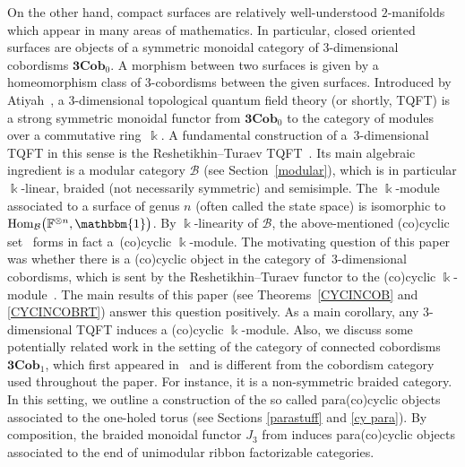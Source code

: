 \documentclass[pdftex]{sigma}
\numberwithin{equation}{section}
\newcommand{\tens}{\otimes}
\newcommand{\mc}{\mathcal}
\newcommand{\N}{\mathbb{N}}
\newcommand{\Hom}{\mathrm{Hom}}
\newcommand{\kk}{\Bbbk}
\newcommand{\uu}{\mathbbm{1}}
\newcommand{\coend}{\mathbb{F}}
\begin{document}
On the other hand, compact surfaces are relatively well-understood $2$-manifolds which appear in many areas of mathematics. In particular, closed oriented surfaces are objects of a symmetric monoidal category of $3$-dimensional cobordisms $\textbf{3Cob}_0$. A morphism between two surfaces is given by a homeomorphism class of $3$-cobordisms between the given surfaces. Introduced by Atiyah~\cite{At}, a $3$-dimensional topological quantum field theory (or shortly, TQFT) is a strong symmetric monoidal functor from $\textbf{3Cob}_0$ to the category of modules over a commutative ring~$\kk$.
 A fundamental construction of a~$3$-dimensional TQFT in this sense is the Reshetikhin--Turaev TQFT~\cite{reshetikhin_invariants_1991,turaevqinvariants}.
Its main algebraic ingredient is a modular category $\mc B$ (see Section~\ref{modular}), which is in particular $\kk$-linear, braided (not necessarily symmetric) and semisimple.
The $\kk$-module associated to a surface of genus $n$ (often called the state space) is isomorphic to~$\Hom_{\mc B}\bigl(\coend^{\tens n}, \uu\bigr)$.
By $\kk$-linearity of $\mc B$, the above-mentioned (co)cyclic set~\smash{$\bigl\{\Hom_{\mc B}\bigl(\coend^{\tens n+1}, \uu\bigr)\bigr\}_{n\in \N}$} forms in fact a~(co)cyclic $\kk$-module.
The motivating question of this paper was whether there is a (co)cyclic object in the category of~$3$-dimensional cobordisms, which is sent by the Reshetikhin--Turaev functor to the (co)cyclic $\kk$-module~\smash{$\bigl\{\Hom_{\mc B}\bigl(\coend^{\tens n+1}, \uu\bigr)\bigr\}_{n\in \N}$}.
The main results of this paper (see Theorems~\ref{CYCINCOB} and \ref{CYCINCOBRT}) answer this question positively.
As a main corollary, any $3$-dimensional TQFT induces a (co)cyclic $\kk$-module.
Also, we discuss some potentially related work in the setting of the category of connected cobordisms $\textbf{3Cob}_1$, which first appeared in~\cite{kerler} and is different from the cobordism category used throughout the paper. For instance, it is a non-symmetric braided category.
In this setting, we outline a construction of the so called para(co)cyclic objects associated to the one-holed torus (see Sections \ref{parastuff} and \ref{cy para}). By composition, the braided monoidal functor $J_3$ from \cite{beliakova-derenzi} induces para(co)cyclic objects associated to the end of unimodular ribbon factorizable categories.
\end{document}
